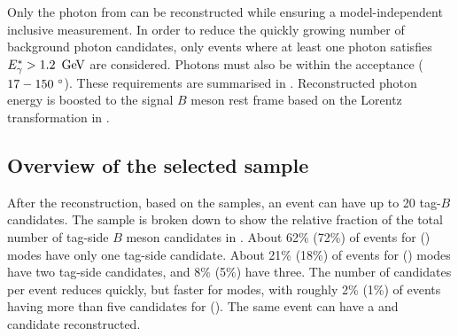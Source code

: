 Only the photon from \BtoXsgamma can be reconstructed while ensuring a model-independent inclusive measurement.
In order to reduce the quickly growing number of background photon candidates, only events where at least one photon satisfies ${E^*_{\gamma}}>1.2~\mathrm{\,Ge\kern -0.1em V}$ are considered.
Photons must also be within the \CDC acceptance ($17-150~^{\circ}$).
These requirements are summarised in .
Reconstructed photon energy is boosted to the signal $B$ meson rest frame based on the Lorentz transformation in .
\begin{table}[hbtp!]
    \centering
     \caption{\label{tab:photon_requirements} Requirements for photons in reconstructed events.}
\end{table}

\subsection{Overview of the selected sample}\label{sec:reconstruction_overview}

After the reconstruction, based on the \MC samples, an event can have up to 20 tag-$B$ candidates.
The sample is broken down to show the relative fraction of the total number of tag-side $B$ meson candidates in 
.
About 62\% (72\%) of events for \feiBp (\feiBz) modes have only one tag-side candidate.
About 21\% (18\%) of events for \feiBp (\feiBz) modes have two tag-side candidates, and 8\% (5\%) have three.
The number of candidates per event reduces quickly, but faster for \Bz modes, with roughly 2\% (1\%) 
of events having more than five candidates for \feiBp (\feiBz).
The same event can have a \Bp and \Bz candidate reconstructed.

